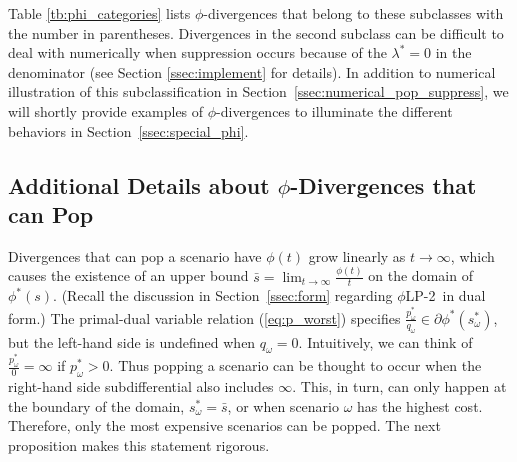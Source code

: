 \documentclass[opre,nonblindrev]{informs3} %
\newcommand{\plp}{$\phi$LP-2}
\begin{document}
Table \ref{tb:phi_categories} lists $\phi$-divergences that belong to these subclasses with the number in parentheses.
Divergences in the second subclass can be difficult to deal with numerically when suppression occurs because of the $\lambda^* = 0$ in the denominator (see Section \ref{ssec:implement} for details).
In addition to numerical illustration of this subclassification in Section~\ref{ssec:numerical_pop_suppress}, we will shortly provide examples of $\phi$-divergences to illuminate the different behaviors in Section~\ref{ssec:special_phi}. 




\subsection{Additional Details about $\phi$-Divergences that can Pop}
\label{ssec:pop}

Divergences that can pop a scenario have $\phi(t)$ grow linearly as $t \rightarrow \infty$, which causes the existence of an upper bound $\bar{s} = \lim_{t \rightarrow \infty} \frac{\phi(t)}{t}$ on the domain of $\phi^*(s)$.
(Recall the discussion in Section~\ref{ssec:form} regarding \plp\ in dual form.)
The primal-dual variable relation (\ref{eq:p_worst}) specifies $\frac{p^*_\omega}{q_\omega} \in \partial \phi^*(s^*_\omega)$, but the left-hand side is undefined when $q_\omega = 0$.
Intuitively, we can think of $\frac{p^*_\omega}{0} = \infty$ if $p^*_\omega > 0$. 
Thus popping a scenario can be thought to occur when the right-hand side subdifferential also includes $\infty$.
This, in turn, can only happen at the boundary of the domain, $s^*_\omega = \bar{s}$, or when scenario $\omega$ has the highest cost.
Therefore, only the most expensive scenarios can be popped. 
The next proposition makes this statement rigorous.
\end{document}
